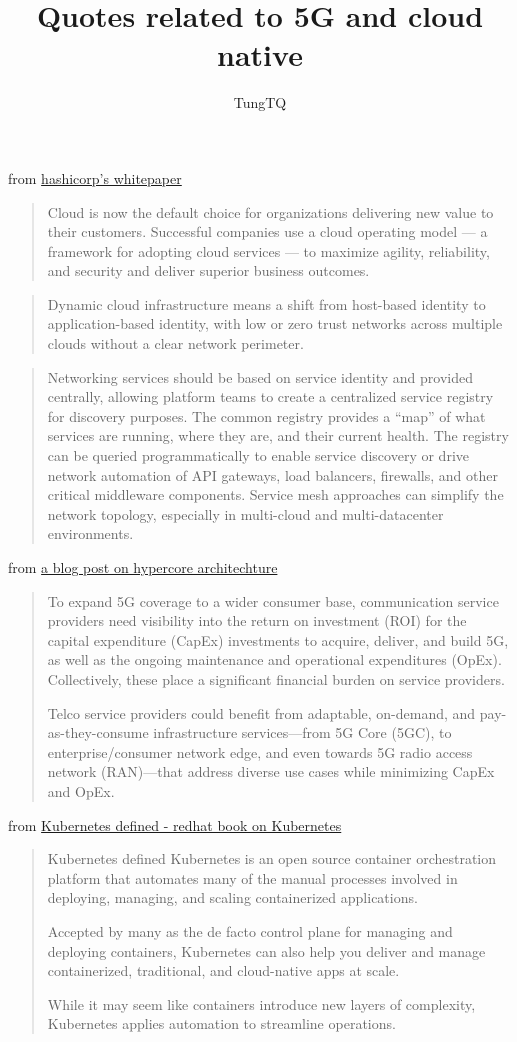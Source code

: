 \documentclass[a4paper]{article}
\author{TungTQ}
\title{Quotes related to 5G and cloud native}
\begin{document}
from \href{https://www.datocms-assets.com/2885/1654902115-hashicorp_a_cloud_operating_model_for_platform_teams.pdf}{hashicorp's whitepaper}
\begin{quote}
Cloud is now the default choice for organizations delivering new value to their customers.
Successful companies use a cloud operating model — a framework for adopting cloud
services — to maximize agility, reliability, and security and deliver superior business
outcomes.
\end{quote}%
\begin{quote}
Dynamic cloud infrastructure means a shift from host-based identity to application-based identity, with
low or zero trust networks across multiple clouds without a clear network perimeter.
\end{quote}
\begin{quote}
Networking services should be based on service identity and provided centrally, allowing platform
teams to create a centralized service registry for discovery purposes. The common registry provides a
“map” of what services are running, where they are, and their current health. The registry can be queried
programmatically to enable service discovery or drive network automation of API gateways, load
balancers, firewalls, and other critical middleware components. Service mesh approaches can simplify
the network topology, especially in multi-cloud and multi-datacenter environments.
\end{quote}

from \href{https://www.redhat.com/architect/5g-open-hypercore-architecture}{a blog post on hypercore architechture}
\begin{quote}
To expand 5G coverage to a wider consumer base, communication service providers need visibility into the return on investment (ROI) for the capital expenditure (CapEx) investments to acquire, deliver, and build 5G, as well as the ongoing maintenance and operational expenditures (OpEx). Collectively, these place a significant financial burden on service providers.

Telco service providers could benefit from adaptable, on-demand, and pay-as-they-consume infrastructure services—from 5G Core (5GC), to enterprise/consumer network edge, and even towards 5G radio access network (RAN)—that address diverse use cases while minimizing CapEx and OpEx.
\end{quote}

from \href{https://www.redhat.com/rhdc/managed-files/cl-architect-guide-multicloud-infrastructure-ebook-f29609-202108-en.pdf}{Kubernetes defined - redhat book on Kubernetes}
\begin{quote}
Kubernetes defined
Kubernetes is an open source container
orchestration platform that automates many
of the manual processes involved in deploying,
managing, and scaling containerized
applications.

Accepted by many as the de facto control plane
for managing and deploying containers,
Kubernetes can also help you deliver and
manage containerized, traditional, and
cloud-native apps at scale.

While it may seem like containers introduce new
layers of complexity, Kubernetes applies
automation to streamline operations.
\end{quote}
\end{document}
